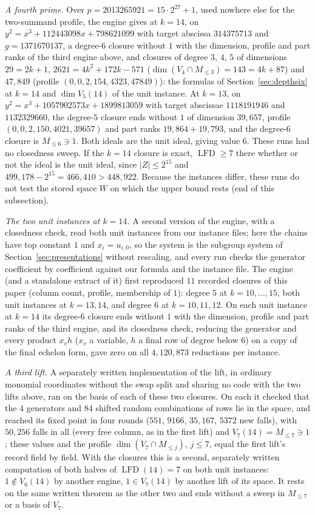 \documentclass[11pt]{article}
\theoremstyle{definition}\newtheorem{definition}[theorem]{Definition}
\theoremstyle{remark}\newtheorem{remark}[theorem]{Remark}
\newcommand{\lfd}{\operatorname{LFD}}
\begin{document}
\emph{A fourth prime.} Over $p=2013265921=15\cdot2^{27}+1$, used nowhere else
for the two-summand profile, the engine gives at $k=14$, on
$y^2=x^3+112443098x+798621099$ with target abscissa $314375713$ and
$g=1371670137$, a degree-$6$ closure without $1$ with the dimension, profile
and part ranks of the third engine above, and closures of degree $3$, $4$,
$5$ of dimensions $29=2k+1$, $2621=4k^2+172k-571$ ($\dim(V_4\cap
M_{\le3})=143=4k+87$) and $47{,}849$ (profile $(0,0,2,154,4323,47849)$): the
formulas of Section~\ref{sec:depthsix} at $k=14$ and $\dim V_5(14)$ of the
unit instance. At $k=13$, on $y^2=x^3+1057902573x+1899813059$ with target
abscissae $1118191946$ and $1132329660$, the degree-$5$ closure ends without
$1$ of dimension $39{,}657$, profile $(0,0,2,150,4021,39657)$ and part ranks
$19{,}864+19{,}793$, and the degree-$6$ closure is $M_{\le6}\ni1$. Both
ideals are the unit ideal, giving value $6$. These runs had no closedness
sweep. If the $k=14$ closure is exact, $\lfd\ge7$ there whether or not the
ideal is the unit ideal, since $|Z|\le2^{15}$ and
$499{,}178-2^{15}=466{,}410>448{,}922$. Because the instances differ, these
runs do not test the stored space $W$ on which the upper bound rests (end of
this subsection).

\emph{The two unit instances at $k=14$.} A second version of the engine,
with a closedness check, read both unit instances from our instance files;
here the chains have top constant $1$ and $x_i=u_{i,0}$, so the system is the
subgroup system of Section~\ref{sec:presentations} without rescaling, and
every run checks the generator coefficient by coefficient against our formula
and the instance file. The engine (and a standalone extract of it) first
reproduced $11$ recorded closures of this paper (column count, profile,
membership of $1$): degree $5$ at $k=10,\ldots,15$, both unit instances at
$k=13,14$, and degree $6$ at $k=10,11,12$. On each unit instance at $k=14$
its degree-$6$ closure ends without $1$ with the dimension, profile and part
ranks of the third engine, and its closedness check, reducing the generator
and every product $x_vh$ ($x_v$ a variable, $h$ a final row of degree below
$6$) on a copy of the final echelon form, gave zero on all $4{,}120{,}873$
reductions per instance.

\emph{A third lift.} A separately written implementation of the lift, in
ordinary monomial coordinates without the swap split and sharing no code with
the two lifts above, ran on the basis of each of these two closures. On each
it checked that the $4$ generators and $84$ shifted random combinations of
rows lie in the space, and reached its fixed point in four rounds ($551$,
$9166$, $35{,}167$, $5372$ new falls), with $50{,}256$ falls in all (every
free column, as in the first lift) and $V_7(14)=M_{\le7}\ni1$; these values
and the profile $\dim(V_7\cap M_{\le j})$, $j\le7$, equal the first lift's
record field by field. With the closures this is a second, separately written
computation of both halves of $\lfd(14)=7$ on both unit instances:
$1\notin V_6(14)$ by another engine, $1\in V_7(14)$ by another lift of its
space. It rests on the same written theorem as the other two and ends without
a sweep in $M_{\le7}$ or a basis of $V_7$.
\end{document}
